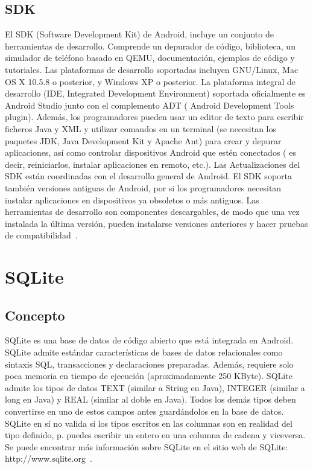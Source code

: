 \subsection{SDK}
El SDK (Software Development Kit) de Android, incluye un conjunto de herramientas de desarrollo. Comprende un depurador de código, biblioteca, un simulador de teléfono basado en QEMU, documentación, ejemplos de código y tutoriales. Las plataformas de desarrollo soportadas incluyen GNU/Linux, Mac OS X 10.5.8 o posterior, y Windows XP o posterior. La plataforma integral de desarrollo (IDE, Integrated Development Environment) soportada oficialmente es Android Studio junto con el complemento ADT ( Android Development Tools plugin). Además, los programadores pueden usar un editor de texto para escribir ficheros Java y XML y utilizar comandos en un terminal (se necesitan los paquetes JDK, Java Development Kit y Apache Ant) para crear y depurar aplicaciones, así como controlar dispositivos Android que estén conectados ( es decir, reiniciarlos, instalar aplicaciones en remoto, etc.). 
Las Actualizaciones del SDK están coordinadas con el desarrollo general de Android. El SDK soporta también versiones antiguas de Android, por si los programadores necesitan instalar aplicaciones en dispositivos ya obsoletos o más antiguos. Las herramientas de desarrollo son componentes descargables, de modo que una vez instalada la última versión, pueden instalarse versiones anteriores y hacer pruebas de compatibilidad~\cite{wiki:androidsdk}. 

\section{SQLite}
\subsection{Concepto}
SQLite es una base de datos de código abierto que está integrada en Android. SQLite admite estándar características de bases de datos relacionales como sintaxis SQL, transacciones y declaraciones preparadas. Además, requiere solo poca memoria en tiempo de ejecución (aproximadamente 250 KByte). SQLite admite los tipos de datos TEXT (similar a String en Java), INTEGER (similar a long en Java) y REAL (similar al doble en Java). Todos los demás tipos deben convertirse en uno de estos campos antes guardándolos en la base de datos. SQLite en sí no valida si los tipos escritos en las columnas son en realidad del tipo definido, p. puedes escribir un entero en una columna de cadena y viceversa. Se puede encontrar más información sobre SQLite en el sitio web de SQLite: http://www.sqlite.org~\cite{vogel2010android}.
